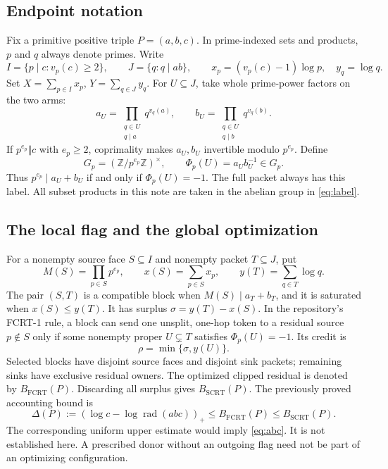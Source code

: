 \documentclass[11pt,a4paper]{article}
\theoremstyle{definition}
\theoremstyle{remark}
\DeclareMathOperator{\rad}{rad}
\newcommand{\FCRT}{B_{\mathrm{FCRT}}}
\newcommand{\SCRT}{B_{\mathrm{SCRT}}}
\newcommand{\Z}{\mathbb Z}
\newcommand{\pos}[1]{\left(#1\right)_{+}}
\begin{document}
\subsection{Endpoint notation}
Fix a primitive positive triple $P=(a,b,c)$. In prime-indexed sets and
products, $p$ and $q$ always denote primes. Write
\[
 I=\{p\mid c:v_p(c)\ge2\},\qquad J=\{q:q\mid ab\},
 \qquad x_p=(v_p(c)-1)\log p,\quad y_q=\log q.
\]
Set $X=\sum_{p\in I}x_p$, $Y=\sum_{q\in J}y_q$. For $U\subseteq J$, take
whole prime-power factors on the two arms:
\[
 a_U=\prod_{\substack{q\in U\\q\mid a}}q^{v_q(a)},\qquad
 b_U=\prod_{\substack{q\in U\\q\mid b}}q^{v_q(b)}.
\]
If $p^{e_p}\Vert c$ with $e_p\ge2$, coprimality makes $a_U,b_U$ invertible
modulo $p^{e_p}$. Define
\begin{equation}\label{eq:label}
 G_p=(\Z/p^{e_p}\Z)^\times,\qquad
 \Phi_p(U)=a_U b_U^{-1}\in G_p.
\end{equation}
Thus $p^{e_p}\mid a_U+b_U$ if and only if $\Phi_p(U)=-1$. The full packet
always has this label. All subset products in this note are taken in the
abelian group in \eqref{eq:label}.

\subsection{The local flag and the global optimization}
For a nonempty source face $S\subseteq I$ and nonempty packet $T\subseteq J$,
put
\[
 M(S)=\prod_{p\in S}p^{e_p},\qquad x(S)=\sum_{p\in S}x_p,
 \qquad y(T)=\sum_{q\in T}\log q.
\]
The pair $(S,T)$ is a compatible block when $M(S)\mid a_T+b_T$, and it is
saturated when $x(S)\le y(T)$. It has surplus $\sigma=y(T)-x(S)$.
In the repository's FCRT-1 rule, a block can send one unsplit, one-hop token
to a residual source $p\notin S$ only if some nonempty proper $U\subsetneq T$
satisfies $\Phi_p(U)=-1$. Its credit is
\begin{equation}\label{eq:cap}
 \rho=\min\{\sigma,y(U)\}.
\end{equation}
Selected blocks have disjoint source faces and disjoint sink packets;
remaining sinks have exclusive residual owners. The optimized clipped
residual is denoted by $\FCRT(P)$. Discarding all surplus gives $\SCRT(P)$.
The previously proved accounting bound is
\begin{equation}\label{eq:bridge}
 \Delta(P):=\pos{\log c-\log\rad(abc)}\le\FCRT(P)\le\SCRT(P).
\end{equation}
The corresponding uniform upper estimate would imply \eqref{eq:abc}.
It is not established here. A prescribed donor without an outgoing flag
need not be part of an optimizing configuration.
\end{document}
